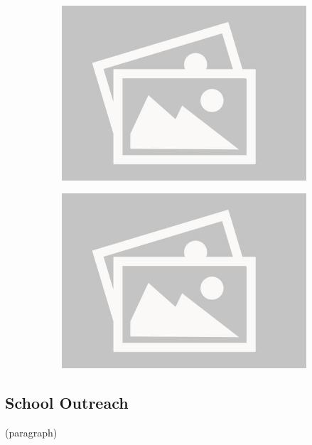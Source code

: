 \documentclass[a4paper,12pt]{report}
\begin{document}
\begin{figure}[H]
    \centering
    \begin{subfigure}{0.32\linewidth}
        \includegraphics[width=0.99\linewidth]{./photos/placeholder.jpg}
    \end{subfigure}
    \begin{subfigure}{0.32\linewidth}
        \includegraphics[width=0.99\linewidth]{./photos/placeholder.jpg}
    \end{subfigure}
\end{figure}

\subsection*{School Outreach}
(paragraph)

\newpage
\end{document}
